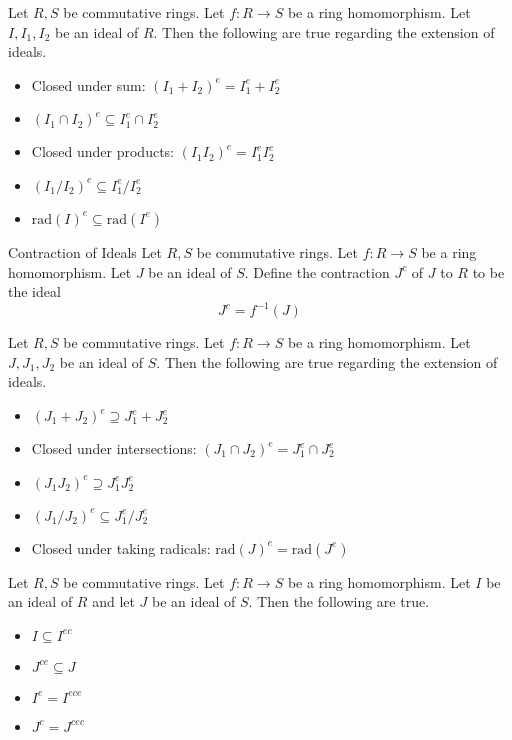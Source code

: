 \documentclass[a4paper]{article}
\begin{document}
\begin{prp}{}{} Let $R,S$ be commutative rings. Let $f:R\to S$ be a ring homomorphism. Let $I,I_1,I_2$ be an ideal of $R$. Then the following are true regarding the extension of ideals. 
\begin{itemize}
\item Closed under sum: $(I_1+I_2)^e=I_1^e+I_2^e$
\item $(I_1\cap I_2)^e\subseteq I_1^e\cap I_2^e$
\item Closed under products: $(I_1I_2)^e=I_1^eI_2^e$
\item $(I_1/I_2)^e\subseteq I_1^e/I_2^e$
\item $\text{rad}(I)^e\subseteq\text{rad}(I^e)$
\end{itemize}
\end{prp}

\begin{defn}{Contraction of Ideals}{} Let $R,S$ be commutative rings. Let $f:R\to S$ be a ring homomorphism. Let $J$ be an ideal of $S$. Define the contraction $J^c$ of $J$ to $R$ to be the ideal $$J^c=f^{-1}(J)$$
\end{defn}

\begin{prp}{}{} Let $R,S$ be commutative rings. Let $f:R\to S$ be a ring homomorphism. Let $J,J_1,J_2$ be an ideal of $S$. Then the following are true regarding the extension of ideals. 
\begin{itemize}
\item $(J_1+J_2)^e\supseteq J_1^e+J_2^e$
\item Closed under intersections: $(J_1\cap J_2)^e=J_1^e\cap J_2^e$
\item $(J_1J_2)^e\supseteq J_1^eJ_2^e$
\item $(J_1/J_2)^e\subseteq J_1^e/J_2^e$
\item Closed under taking radicals: $\text{rad}(J)^e=\text{rad}(J^e)$
\end{itemize}
\end{prp}

\begin{prp}{}{} Let $R,S$ be commutative rings. Let $f:R\to S$ be a ring homomorphism. Let $I$ be an ideal of $R$ and let $J$ be an ideal of $S$. Then the following are true. 
\begin{itemize}
\item $I\subseteq I^{ec}$
\item $J^{ce}\subseteq J$
\item $I^e=I^{ece}$
\item $J^c=J^{cec}$
\end{itemize}
\end{prp}
\end{document}
